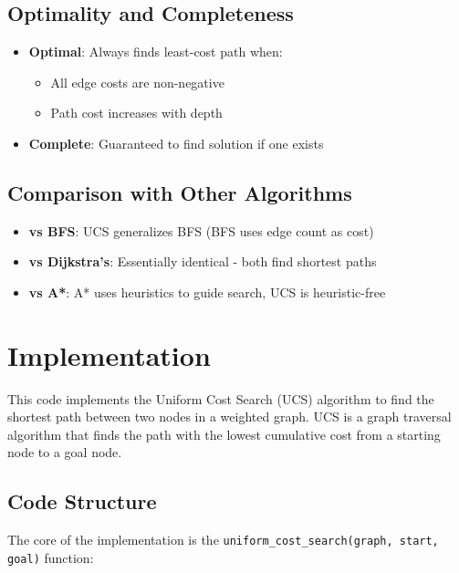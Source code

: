 \documentclass[final, journal, 11pt]{article}
\begin{document}
	\subsection{Optimality and Completeness}
	\begin{itemize}
		\item \textbf{Optimal}: Always finds least-cost path when:
		\begin{itemize}
			\item All edge costs are non-negative
			\item Path cost increases with depth
		\end{itemize}
		
		\item \textbf{Complete}: Guaranteed to find solution if one exists
	\end{itemize}
	
	\subsection{Comparison with Other Algorithms}
	\begin{itemize}
		\item \textbf{vs BFS}: UCS generalizes BFS (BFS uses edge count as cost)
		\item \textbf{vs Dijkstra's}: Essentially identical - both find shortest paths
		\item \textbf{vs A*}: A* uses heuristics to guide search, UCS is heuristic-free
	\end{itemize}
	
	\section{Implementation}
	
	This code implements the Uniform Cost Search (UCS) algorithm to find the shortest path between two nodes in a weighted graph. UCS is a graph traversal algorithm that finds the path with the lowest cumulative cost from a starting node to a goal node.
	
	\subsection{Code Structure}
	
	The core of the implementation is the \texttt{uniform\_cost\_search(graph, start, goal)} function:
	
\end{document}
